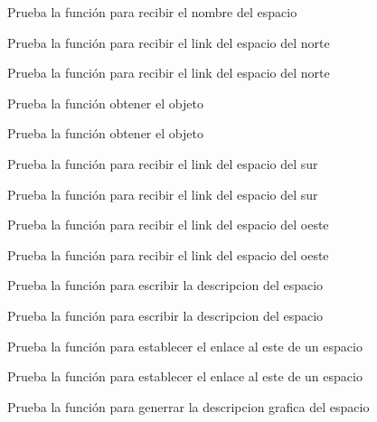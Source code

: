 \begin{DoxyRefList}
Prueba la función para recibir el nombre del espacio  
\item[\label{test__test000047}%
\Hypertarget{test__test000047}%
Member \hyperlink{space__test_8c_a3a87f1e1e173d622bfbd3bcd14e060ca}{test1\+\_\+space\+\_\+get\+\_\+north} ()]Prueba la función para recibir el link del espacio del norte 

Prueba la función para recibir el link del espacio del norte  
\item[\label{test__test000045}%
\Hypertarget{test__test000045}%
Member \hyperlink{space__test_8c_a4a1ca89fa511c04bb07c14edb19c17ba}{test1\+\_\+space\+\_\+get\+\_\+object} ()]Prueba la función obtener el objeto 

Prueba la función obtener el objeto  
\item[\label{test__test000049}%
\Hypertarget{test__test000049}%
Member \hyperlink{space__test_8c_a8e345065f58565e131bdb3a9d0096ed5}{test1\+\_\+space\+\_\+get\+\_\+south} ()]Prueba la función para recibir el link del espacio del sur 

Prueba la función para recibir el link del espacio del sur  
\item[\label{test__test000053}%
\Hypertarget{test__test000053}%
Member \hyperlink{space__test_8c_a1f08c6866885bfc093717f57b1b86539}{test1\+\_\+space\+\_\+get\+\_\+west} ()]Prueba la función para recibir el link del espacio del oeste 

Prueba la función para recibir el link del espacio del oeste  
\item[\label{test__test000057}%
\Hypertarget{test__test000057}%
Member \hyperlink{space__test_8c_a19a1bac3ab9cc6f5bf7ea8c4a72392c4}{test1\+\_\+space\+\_\+set\+\_\+description} ()]Prueba la función para escribir la descripcion del espacio 

Prueba la función para escribir la descripcion del espacio  
\item[\label{test__test000037}%
\Hypertarget{test__test000037}%
Member \hyperlink{space__test_8c_ab1f093af4be3ca8e525d0517cc846f47}{test1\+\_\+space\+\_\+set\+\_\+east} ()]Prueba la función para establecer el enlace al este de un espacio 

Prueba la función para establecer el enlace al este de un espacio  
\item[\label{test__test000071}%
\Hypertarget{test__test000071}%
Member \hyperlink{space__test_8c_a068c22b91236896ae1b077a8f7059458}{test1\+\_\+space\+\_\+set\+\_\+gdesc} ()]Prueba la función para generrar la descripcion grafica del espacio 


\end{DoxyRefList}
